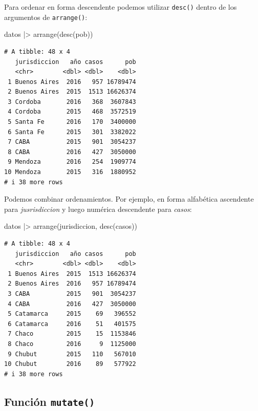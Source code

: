 \documentclass[
  spanish,
  letterpaper,
  DIV=11,
  numbers=noendperiod]{scrreprt}
\newenvironment{Shaded}{\begin{snugshade}}{\end{snugshade}}
\newcommand{\FunctionTok}[1]{\textcolor[rgb]{0.28,0.35,0.67}{#1}}
\newcommand{\NormalTok}[1]{\textcolor[rgb]{0.00,0.23,0.31}{#1}}
\newcommand{\SpecialCharTok}[1]{\textcolor[rgb]{0.37,0.37,0.37}{#1}}
\begin{document}
Para ordenar en forma descendente podemos utilizar \texttt{desc()}
dentro de los argumentos de \texttt{arrange()}:

\begin{Shaded}
\begin{Highlighting}[]
\NormalTok{datos }\SpecialCharTok{|\textgreater{}}
  \FunctionTok{arrange}\NormalTok{(}\FunctionTok{desc}\NormalTok{(pob))}
\end{Highlighting}
\end{Shaded}

\begin{verbatim}
# A tibble: 48 x 4
   jurisdiccion   año casos      pob
   <chr>        <dbl> <dbl>    <dbl>
 1 Buenos Aires  2016   957 16789474
 2 Buenos Aires  2015  1513 16626374
 3 Cordoba       2016   368  3607843
 4 Cordoba       2015   468  3572519
 5 Santa Fe      2016   170  3400000
 6 Santa Fe      2015   301  3382022
 7 CABA          2015   901  3054237
 8 CABA          2016   427  3050000
 9 Mendoza       2016   254  1909774
10 Mendoza       2015   316  1880952
# i 38 more rows
\end{verbatim}

Podemos combinar ordenamientos. Por ejemplo, en forma alfabética
ascendente para \emph{jusrisdiccion} y luego numérica descendente para
\emph{casos}:

\begin{Shaded}
\begin{Highlighting}[]
\NormalTok{datos }\SpecialCharTok{|\textgreater{}}
  \FunctionTok{arrange}\NormalTok{(jurisdiccion, }\FunctionTok{desc}\NormalTok{(casos))}
\end{Highlighting}
\end{Shaded}

\begin{verbatim}
# A tibble: 48 x 4
   jurisdiccion   año casos      pob
   <chr>        <dbl> <dbl>    <dbl>
 1 Buenos Aires  2015  1513 16626374
 2 Buenos Aires  2016   957 16789474
 3 CABA          2015   901  3054237
 4 CABA          2016   427  3050000
 5 Catamarca     2015    69   396552
 6 Catamarca     2016    51   401575
 7 Chaco         2015    15  1153846
 8 Chaco         2016     9  1125000
 9 Chubut        2015   110   567010
10 Chubut        2016    89   577922
# i 38 more rows
\end{verbatim}

\subsection{\texorpdfstring{Función
\texttt{mutate()}}{Función mutate()}}\label{funciuxf3n-mutate}
\end{document}

